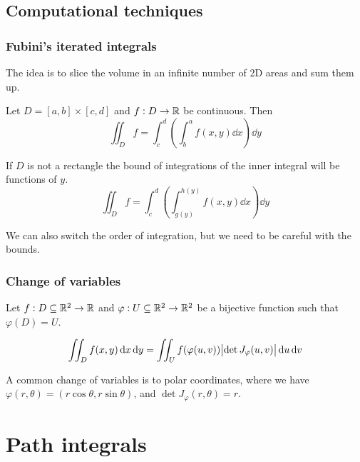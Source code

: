 \documentclass[14pt]{extarticle}
\begin{document}
\subsection{Computational techniques}

\subsubsection{Fubini's iterated integrals}

The idea is to slice the volume in an infinite number of 2D areas and sum them up.

\begin{theorem}[Fubini]
    Let $D = [a, b] \times [c, d]$ and $f: D \to \mathbb{R}$ be continuous.
    Then
    \begin{equation}
        \iint_D f = \int_c^d \left( \int_{b}^{a} f(x, y) \dd{x} \right) \dd{y}
    \end{equation}

    If $D$ is not a rectangle the bound of integrations of the inner integral will be functions of $y$.
    \begin{equation}
        \iint_D f = \int_{c}^{d} \left( \int_{g(y)}^{h(y)} f(x, y) \dd{x} \right) \dd{y}
    \end{equation}
\end{theorem}

\begin{remark}
    We can also switch the order of integration, but we need to be careful with the bounds.
\end{remark}

\subsubsection{Change of variables}

Let $f: D \subseteq \mathbb{R}^2 \to \mathbb{R}$ and $\varphi: U \subseteq \mathbb{R}^2 \to \mathbb{R}^2$ be a bijective function such that $\varphi(D) = U$.

\begin{equation}
    \iint_D f(x, y) \dd{x} \dd{y} = \iint_U f(\varphi(u, v)) \abs{\det J_{\varphi}(u, v)} \dd{u} \dd{v}
\end{equation}

A common change of variables is to polar coordinates, where we have $\varphi(r, \theta) = (r \cos \theta, r \sin \theta)$, and $\det J_{\varphi}(r, \theta) = r$.


\section{Path integrals}
\end{document}
